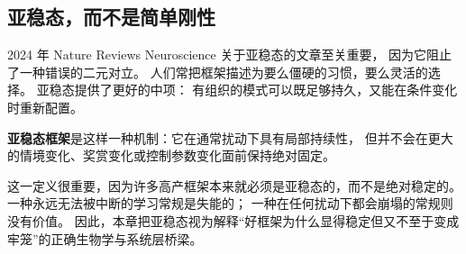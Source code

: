 \subsection{亚稳态，而不是简单刚性}

2024 年 Nature Reviews Neuroscience 关于亚稳态的文章至关重要，
因为它阻止了一种错误的二元对立。
人们常把框架描述为要么僵硬的习惯，要么灵活的选择。
亚稳态提供了更好的中项：
有组织的模式可以既足够持久，又能在条件变化时重新配置。

\begin{definition}[亚稳态框架]
\textbf{亚稳态框架}是这样一种机制：它在通常扰动下具有局部持续性，
但并不会在更大的情境变化、奖赏变化或控制参数变化面前保持绝对固定。
\end{definition}

\begin{discussion}
这一定义很重要，因为许多高产框架本来就必须是亚稳态的，而不是绝对稳定的。
一种永远无法被中断的学习常规是失能的；
一种在任何扰动下都会崩塌的常规则没有价值。
因此，本章把亚稳态视为解释“好框架为什么显得稳定但又不至于变成牢笼”的正确生物学与系统层桥梁。
\end{discussion}
